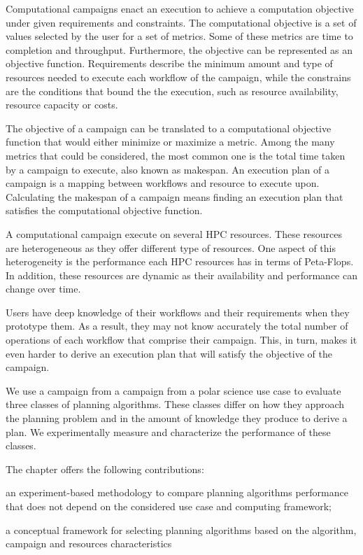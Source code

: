 \label{ch:campaigns}
Computational campaigns enact an execution to achieve a computation objective under given requirements and constraints.
The computational objective is a set of values selected by the user for a set of metrics.
Some of these metrics are time to completion and throughput.
Furthermore, the objective can be represented as an objective function.
Requirements describe the minimum amount and type of resources needed to execute each workflow of the campaign, while the constrains are the conditions that bound the the execution, such as resource availability, resource capacity or costs.

The objective of a campaign can be translated to a computational objective function that would either minimize or maximize a metric.
Among the many metrics that could be considered, the most common one is the total time taken by a campaign to execute, also known as makespan.
An execution plan of a campaign is a mapping between workflows and resource to execute upon.
Calculating the makespan of a campaign means finding an execution plan that satisfies the computational objective function.

A computational campaign execute on several HPC resources.
These resources are heterogeneous as they offer different type of resources.
One aspect of this heterogeneity is the performance each HPC resources has in terms of Peta-Flops.
In addition, these resources are dynamic as their availability and performance can change over time.

Users have deep knowledge of their workflows and their requirements when they prototype them.
As a result, they may not know accurately the total number of operations of each workflow that comprise their campaign.
This, in turn, makes it even harder to derive an execution plan that will satisfy the objective of the campaign.

We use a campaign from a campaign from a polar science use case to evaluate three classes of planning algorithms.
These classes differ on how they approach the planning problem and in the amount of knowledge they produce to derive a plan.
We experimentally measure and characterize the performance of these classes.

The chapter offers the following contributions:
\begin{inparaenum}[i)]
    \item an experiment-based methodology to compare planning algorithms performance that does not depend on the considered use case and computing framework;
    \item a conceptual framework for selecting planning algorithms based on the algorithm, campaign and resources characteristics
\end{inparaenum}

